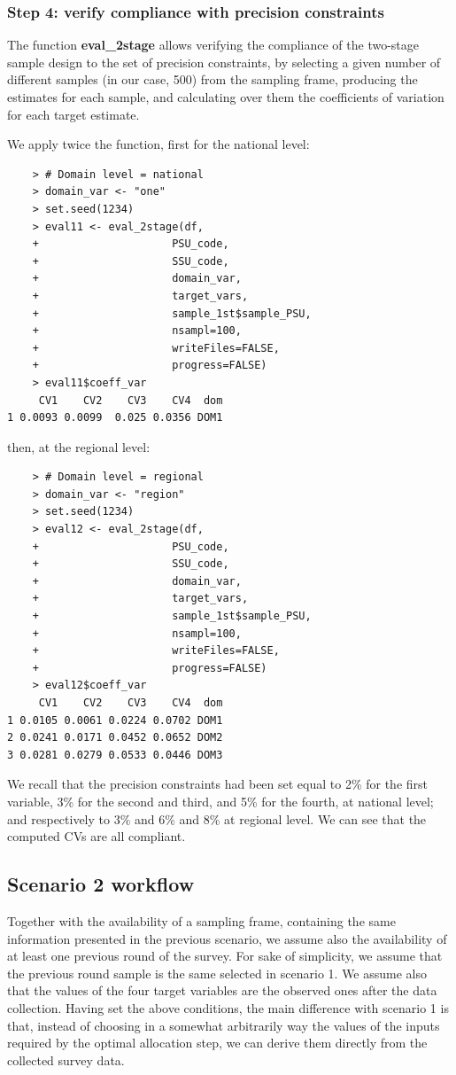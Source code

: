 \subsubsection{Step 4: verify compliance with precision constraints}

The function \textbf{eval\_2stage} allows verifying the compliance of the two-stage sample design to the set of precision constraints, by selecting a given number of different samples (in our case, 500) from the sampling frame, producing the estimates for each sample, and calculating over them the coefficients of variation for each target estimate.

We apply twice the function, first for the national level:
\begin{verbatim}
	> # Domain level = national
	> domain_var <- "one"
	> set.seed(1234)
	> eval11 <- eval_2stage(df,
	+                     PSU_code,
	+                     SSU_code,
	+                     domain_var,
	+                     target_vars,
	+                     sample_1st$sample_PSU,
	+                     nsampl=100, 
	+                     writeFiles=FALSE,
	+                     progress=FALSE) 
	> eval11$coeff_var
     CV1    CV2    CV3    CV4  dom
1 0.0093 0.0099  0.025 0.0356 DOM1
\end{verbatim}
then, at the regional level:
\begin{verbatim}
	> # Domain level = regional
	> domain_var <- "region"
	> set.seed(1234)
	> eval12 <- eval_2stage(df,
	+                     PSU_code,
	+                     SSU_code,
	+                     domain_var,
	+                     target_vars,
	+                     sample_1st$sample_PSU,
	+                     nsampl=100, 
	+                     writeFiles=FALSE,
	+                     progress=FALSE) 
	> eval12$coeff_var
     CV1    CV2    CV3    CV4  dom
1 0.0105 0.0061 0.0224 0.0702 DOM1
2 0.0241 0.0171 0.0452 0.0652 DOM2
3 0.0281 0.0279 0.0533 0.0446 DOM3
\end{verbatim}

We recall that the precision constraints had been set equal to 2\% for the first variable, 3\% for the second and third, and 5\% for the fourth, at national level; and respectively to 3\% and 6\% and 8\% at regional level. We can see that the computed CVs are all compliant.

\subsection{Scenario 2 workflow}
Together with the availability of a sampling frame, containing the same information presented in the previous scenario, we assume also the availability of at least one previous round of the survey.
For sake of simplicity, we assume that the previous round sample is the same selected in scenario 1. We assume also that the values of the four target variables are the observed ones after the data collection. 
Having set the above conditions, the main difference with scenario 1 is that, instead of choosing in a somewhat arbitrarily way the values of the inputs required by the optimal allocation step, we can derive them directly from the collected survey data.

